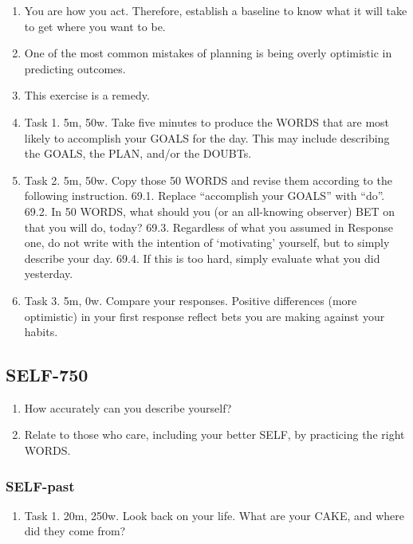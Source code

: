 \documentclass[
]{book}
\providecommand{\tightlist}{%
  \setlength{\itemsep}{0pt}\setlength{\parskip}{0pt}}
\begin{document}
\begin{enumerate}
\def\labelenumi{\arabic{enumi}.}
\setcounter{enumi}{64}
\item
  You are how you act. Therefore, establish a baseline to know what it will take to
  get where you want to be.
\item
  One of the most common mistakes of planning is being overly optimistic in
  predicting outcomes.
\item
  This exercise is a remedy.
\item
  Task 1. 5m, 50w. Take five minutes to produce the WORDS that are most likely
  to accomplish your GOALS for the day. This may include describing the GOALS,
  the PLAN, and/or the DOUBTs.
\item
  Task 2. 5m, 50w. Copy those 50 WORDS and revise them according to the
  following instruction.
  69.1. Replace ``accomplish your GOALS'' with ``do''.
  69.2. In 50 WORDS, what should you (or an all-knowing observer) BET on that
  you will do, today?
  69.3. Regardless of what you assumed in Response one, do not write with the
  intention of `motivating' yourself, but to simply describe your day.
  69.4. If this is too hard, simply evaluate what you did yesterday.
\item
  Task 3. 5m, 0w. Compare your responses. Positive differences (more optimistic)
  in your first response reflect bets you are making against your habits.
\end{enumerate}

\subsection{SELF-750}\label{self-750}

\begin{enumerate}
\def\labelenumi{\arabic{enumi}.}
\setcounter{enumi}{70}
\tightlist
\item
  How accurately can you describe yourself?
\item
  Relate to those who care, including your better SELF, by practicing the right
  WORDS.
\end{enumerate}

\subsubsection{SELF-past}\label{self-past}

\begin{enumerate}
\def\labelenumi{\arabic{enumi}.}
\setcounter{enumi}{72}
\tightlist
\item
  Task 1. 20m, 250w. Look back on your life. What are your CAKE, and where did
  they come from?
\end{enumerate}
\end{document}
